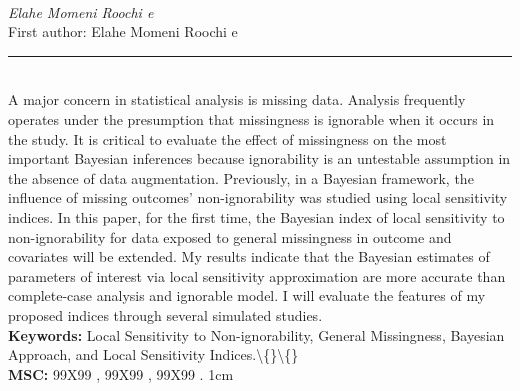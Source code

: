 \documentclass[10pt,twoside]{article}
\begin{document}
\noindent\begin{minipage}[t][\textheight]{\textwidth}
\\[0.35em]
{\itshape Elahe Momeni Roochi e}\\[0.2em]
{\footnotesize First author: Elahe Momeni Roochi e}\\[0.45em]
\noindent\rule{\textwidth}{0.3pt}\\[0.4em]
{\footnotesize  A major concern in statistical analysis is missing data. Analysis frequently operates under the presumption that missingness is ignorable when it occurs in the study. It is critical to evaluate the effect of missingness on the most important Bayesian inferences because ignorability is an untestable assumption in the absence of data augmentation. Previously, in a Bayesian framework, the influence of missing outcomes' non-ignorability was studied using local sensitivity indices. In this paper, for the first time, the Bayesian index of local sensitivity to non-ignorability for data exposed to general missingness in outcome and covariates will be extended. My results indicate that the Bayesian estimates of parameters of interest via local sensitivity approximation are more accurate than complete-case analysis and ignorable model. I will evaluate the features of my proposed indices through several simulated studies.}\\[0.4em]
{\footnotesize\bfseries Keywords:} {\footnotesize Local Sensitivity to Non-ignorability, General Missingness, Bayesian Approach, and Local Sensitivity Indices.\textbackslash\{\}\textbackslash\{\}}\\[0.15em]
{\footnotesize\bfseries MSC:} {\footnotesize 99X99 , 99X99 , 99X99 . 1cm}\\
\vfill
\end{minipage}
\newpage
\end{document}
